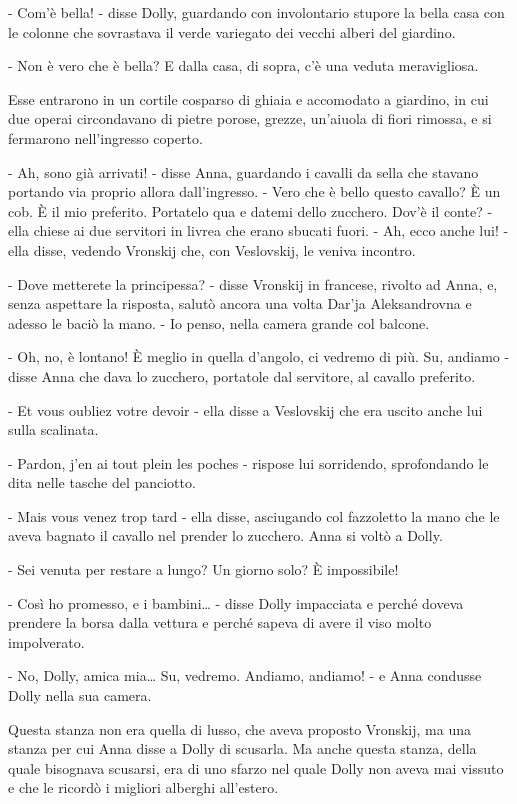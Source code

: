 - Com'è bella! - disse Dolly, guardando con involontario stupore la bella casa con le colonne che sovrastava il verde variegato dei vecchi alberi del giardino. 

- Non è vero che è bella? E dalla casa, di sopra, c'è una veduta meravigliosa. 

Esse entrarono in un cortile cosparso di ghiaia e accomodato a giardino, in cui due operai circondavano di pietre porose, grezze, un'aiuola di fiori rimossa, e si fermarono nell'ingresso coperto. 

- Ah, sono già arrivati! - disse Anna, guardando i cavalli da sella che stavano portando via proprio allora dall'ingresso. - Vero che è bello questo cavallo? È un cob. È il mio preferito. Portatelo qua e datemi dello zucchero. Dov'è il conte? - ella chiese ai due servitori in livrea che erano sbucati fuori. - Ah, ecco anche lui! - ella disse, vedendo Vronskij che, con Veslovskij, le veniva incontro. 

- Dove metterete la principessa? - disse Vronskij in francese, rivolto ad Anna, e, senza aspettare la risposta, salutò ancora una volta Dar'ja Aleksandrovna e adesso le baciò la mano. - Io penso, nella camera grande col balcone. 

- Oh, no, è lontano! È meglio in quella d'angolo, ci vedremo di più. Su, andiamo - disse Anna che dava lo zucchero, portatole dal servitore, al cavallo preferito. 

- Et vous oubliez votre devoir - ella disse a Veslovskij che era uscito anche lui sulla scalinata. 

- Pardon, j'en ai tout plein les poches - rispose lui sorridendo, sprofondando le dita nelle tasche del panciotto. 

- Mais vous venez trop tard - ella disse, asciugando col fazzoletto la mano che le aveva bagnato il cavallo nel prender lo zucchero. Anna si voltò a Dolly. 

- Sei venuta per restare a lungo? Un giorno solo? È impossibile! 

- Così ho promesso, e i bambini\ldots{} - disse Dolly impacciata e perché doveva prendere la borsa dalla vettura e perché sapeva di avere il viso molto impolverato. 

- No, Dolly, amica mia\ldots{} Su, vedremo. Andiamo, andiamo! - e Anna condusse Dolly nella sua camera. 

Questa stanza non era quella di lusso, che aveva proposto Vronskij, ma una stanza per cui Anna disse a Dolly di scusarla. Ma anche questa stanza, della quale bisognava scusarsi, era di uno sfarzo nel quale Dolly non aveva mai vissuto e che le ricordò i migliori alberghi all'estero. 

